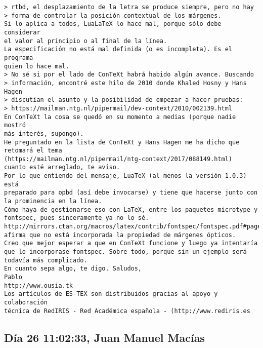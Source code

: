 \documentclass[a4paper,10pt]{article}
\begin{document}
\begin{lstlisting}
> rtbd, el desplazamiento de la letra se produce siempre, pero no hay
> forma de controlar la posición contextual de los márgenes.
Si lo aplica a todos, LuaLaTeX lo hace mal, porque sólo debe considerar
el valor al principio o al final de la línea.
La especificación no está mal definida (o es incompleta). Es el programa
quien lo hace mal.
> No sé si por el lado de ConTeXt habrá habido algún avance. Buscando
> información, encontré este hilo de 2010 donde Khaled Hosny y Hans Hagen
> discutían el asunto y la posibilidad de empezar a hacer pruebas:
> https://mailman.ntg.nl/pipermail/dev-context/2010/002139.html
En ConTeXt la cosa se quedó en su momento a medias (porque nadie mostró
más interés, supongo).
He preguntado en la lista de ConTeXt y Hans Hagen me ha dicho que
retomará el tema
(https://mailman.ntg.nl/pipermail/ntg-context/2017/088149.html)
cuanto esté arreglado, te aviso.
Por lo que entiendo del mensaje, LuaTeX (al menos la versión 1.0.3) está
preparado para opbd (así debe invocarse) y tiene que hacerse junto con
la prominencia en la línea.
Cómo haya de gestionarse eso con LaTeX, entre los paquetes microtype y
fontspec, pues sinceramente ya no lo sé.
http://mirrors.ctan.org/macros/latex/contrib/fontspec/fontspec.pdf#page=38
afirma que no está incorporada la propiedad de márgenes ópticos.
Creo que mejor esperar a que en ConTeXt funcione y luego ya intentaría
que lo incorporase fontspec. Sobre todo, porque sin un ejemplo será
todavía más complicado.
En cuanto sepa algo, te digo. Saludos,
Pablo
http://www.ousia.tk
Los artículos de ES-TEX son distribuidos gracias al apoyo y colaboración 
técnica de RedIRIS - Red Académica española - (http://www.rediris.es

\end{lstlisting}

\subsection{Día 26 11:02:33, Juan Manuel Macías}
\end{document}
